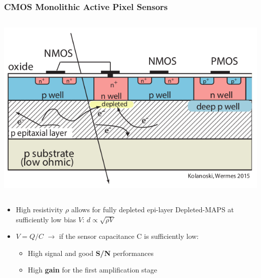    \begin{frame}
        \frametitle{CMOS Monolithic Active Pixel Sensors}
        \begin{columns}
                \vspace*{-0.5cm}
                \hspace*{+1.2cm}
                \includegraphics[width=0.9\linewidth]{figures/Pixel_detectors/MAPS_scheme.png}
            \end{columns}   
        \medskip         
        \begin{itemize}
            \item High resistivity $\rho$ allows for fully depleted epi-layer Depleted-MAPS at sufficiently low bias $V$: 
             $d \propto \sqrt{\rho V}$
            \item $V = Q/C$ $\rightarrow$ if the sensor capacitance C is sufficiently low:
            \begin{itemize}
                \item High signal and good \textbf{S/N} performances  
                \item High \textbf{gain} for the first amplification stage

\end{itemize}
\end{itemize}
\end{frame}
